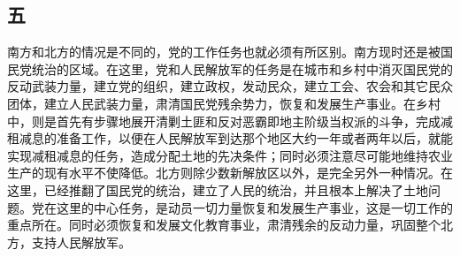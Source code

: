 \documentclass[cn,11pt,chinese]{elegantbook}
\def\myformat#1{\hfil\hfil #1}
\begin{document}
\subsection*{\myformat{五 }}
南方和北方的情况是不同的，党的工作任务也就必须有所区别。南方现时还是被国民党统治的区域。在这里，党和人民解放军的任务是在城市和乡村中消灭国民党的反动武装力量，建立党的组织，建立政权，发动民众，建立工会、农会和其它民众团体，建立人民武装力量，肃清国民党残余势力，恢复和发展生产事业。在乡村中，则是首先有步骤地展开清剿土匪和反对恶霸即地主阶级当权派的斗争，完成减租减息的准备工作，以便在人民解放军到达那个地区大约一年或者两年以后，就能实现减租减息的任务，造成分配土地的先决条件；同时必须注意尽可能地维持农业生产的现有水平不使降低。北方则除少数新解放区以外，是完全另外一种情况。在这里，已经推翻了国民党的统治，建立了人民的统治，并且根本上解决了土地问题。党在这里的中心任务，是动员一切力量恢复和发展生产事业，这是一切工作的重点所在。同时必须恢复和发展文化教育事业，肃清残余的反动力量，巩固整个北方，支持人民解放军。\\
\end{document}
